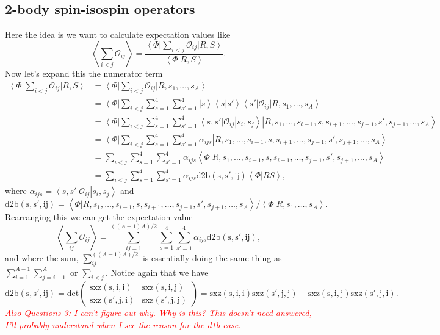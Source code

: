 \documentclass[12pt]{extarticle}
\newcommand{\Oij}{\mathcal{O}_{ij}}
\newcommand{\ket}[1]{\left| #1 \right>}
\newcommand{\bra}[1]{\left< #1 \right|}
\newcommand{\braket}[2]{\left< #1 | #2 \right>}
\newcommand{\mycolor}[1]{\textit{\textcolor{red}{#1}}}
\newcommand{\longsij}{s_1, \ldots, s_{i-1} , s, s_{i+1}, \ldots, s_{j-1}, s', s_{j+1}, \ldots ,s_A}
\begin{document}
\subsection{2-body spin-isospin operators}
Here the idea is we want to calculate expectation values like
\begin{equation}
 \left< \sum_{i<j} \Oij \right> = \frac{\bra{\Phi} \sum\limits_{i<j} \Oij \ket{R,S}}{\braket{\Phi}{R,S}}.
\end{equation}
Now let's expand this the numerator term
\begin{align}
  \bra{\Phi} \sum_{i<j} \Oij \ket{R,S} &= \bra{\Phi} \sum_{i<j} \Oij \ket{R,s_1,\ldots,s_A} \\
  &= \bra{\Phi} \sum_{i<j}\sum_{s=1}^4\sum_{s'=1}^4  \ket{s}\braket{s}{s'}\bra{s'} \Oij \ket{R,s_1,\ldots,s_A} \\
  &= \bra{\Phi} \sum_{i<j}\sum_{s=1}^4\sum_{s'=1}^4  \bra{s,s'}\Oij\ket{s_i,s_j} \ket{R,\longsij} \\
  &= \bra{\Phi} \sum_{i<j}\sum_{s=1}^4\sum_{s'=1}^4 \alpha_{ijs} \ket{R,\longsij} \\
  &= \sum_{i<j}\sum_{s=1}^4\sum_{s'=1}^4 \alpha_{ijs} \braket{\Phi}{R,\longsij} \\
  &= \sum_{i<j}\sum_{s=1}^4\sum_{s'=1}^4 \alpha_{ijs} \mathrm{d2b(s,s',ij)} \braket{\Phi}{RS},
\end{align}
where $\alpha_{ijs} = \bra{s,s'} \Oij \ket{s_i,s_j}$ and
\begin{equation}
  \mathrm{d2b(s,s',ij)} = \braket{\Phi}{R,\longsij}/\braket{\Phi}{R,s_1,\ldots,s_A}.
\end{equation}
Rearranging this we can get the expectation value
\begin{equation}
  \left< \sum_{ij} \Oij \right> = \sum_{ij=1}^{((A-1)A)/2}\sum_{s=1}^4\sum_{s'=1}^4 \alpha_{ijs}\mathrm{d2b(s,s',ij)},
\end{equation}
and where the sum, $\sum\limits_{ij}^{((A-1)A)/2}$ is essentially doing the same thing as $\sum\limits_{i=1}^{A-1}\sum\limits_{j=i+1}^{A}$ or $\sum\limits_{i<j}$.
Notice again that we have
\begin{equation}
  \mathrm{d2b(s,s',ij)} = \mathrm{det} \begin{pmatrix}
  \mathrm{sxz(s,i,i)} & \mathrm{sxz(s,i,j)} \\
  \mathrm{sxz(s',j,i)} & \mathrm{sxz(s',j,j)} \end{pmatrix}
  =\mathrm{sxz(s,i,i)sxz(s',j,j) - sxz(s,i,j)sxz(s',j,i)}.
\end{equation}
\mycolor{Also Questions 3: I can't figure out why. Why is this? This doesn't need answered, I'll probably understand when I see the reason for the d1b case.}
\end{document}
